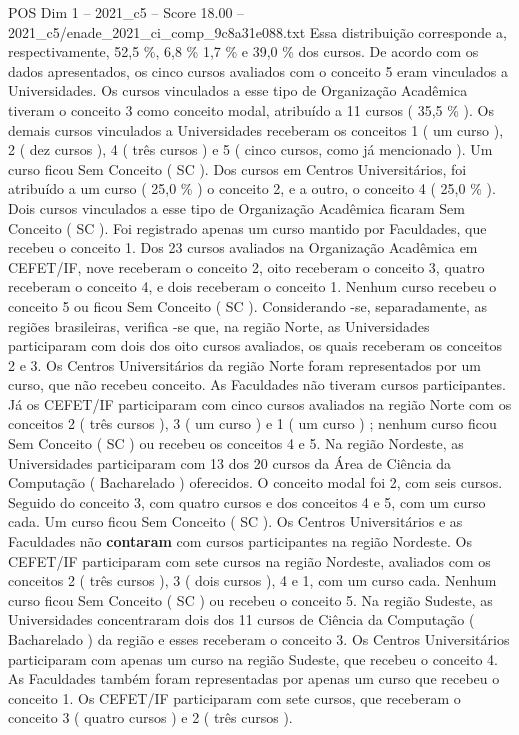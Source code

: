 \begin{textsample}{POS Dim 1 – 2021\_c5 – Score 18.00 – 2021\_c5/enade\_2021\_ci\_comp\_9c8a31e088.txt}
Essa distribuição corresponde a, respectivamente, 52,5 \%, 6,8 \% 1,7 \% e 39,0 \% dos cursos.
De acordo com os dados apresentados, os cinco cursos avaliados com o conceito 5 eram vinculados a Universidades.
Os cursos vinculados a esse tipo de Organização Acadêmica tiveram o conceito 3 como conceito modal, atribuído a 11 cursos ( 35,5 \% ).
Os demais cursos vinculados a Universidades receberam os conceitos 1 ( um curso ), 2 ( dez cursos ), 4 ( três cursos ) e 5 ( cinco cursos, como já mencionado ).
Um curso ficou Sem Conceito ( SC ).
Dos cursos em Centros Universitários, foi atribuído a um curso ( 25,0 \% ) o conceito 2, e a outro, o conceito 4 ( 25,0 \% ).
Dois cursos vinculados a esse tipo de Organização Acadêmica ficaram Sem Conceito ( SC ).
Foi registrado apenas um curso mantido por Faculdades, que recebeu o conceito 1.
Dos 23 cursos avaliados na Organização Acadêmica em CEFET/IF, nove receberam o conceito 2, oito receberam o conceito 3, quatro receberam o conceito 4, e dois receberam o conceito 1.
Nenhum curso recebeu o conceito 5 ou ficou Sem Conceito ( SC ).
Considerando -se, separadamente, as regiões brasileiras, verifica -se que, na região Norte, as Universidades participaram com dois dos oito cursos avaliados, os quais receberam os conceitos 2 e 3.
Os Centros Universitários da região Norte foram representados por um curso, que não recebeu conceito.
As Faculdades não tiveram cursos participantes.
Já os CEFET/IF participaram com cinco cursos avaliados na região Norte com os conceitos 2 ( três cursos ), 3 ( um curso ) e 1 ( um curso ) ; nenhum curso ficou Sem Conceito ( SC ) ou recebeu os conceitos 4 e 5.
Na região Nordeste, as Universidades participaram com 13 dos 20 cursos da Área de Ciência da Computação ( Bacharelado ) oferecidos.
O conceito modal foi 2, com seis cursos.
Seguido do conceito 3, com quatro cursos e dos conceitos 4 e 5, com um curso cada.
Um curso ficou Sem Conceito ( SC ).
Os Centros Universitários e as Faculdades não \textbf{contaram} com cursos participantes na região Nordeste.
Os CEFET/IF participaram com sete cursos na região Nordeste, avaliados com os conceitos 2 ( três cursos ), 3 ( dois cursos ), 4 e 1, com um curso cada.
Nenhum curso ficou Sem Conceito ( SC ) ou recebeu o conceito 5.
Na região Sudeste, as Universidades concentraram dois dos 11 cursos de Ciência da Computação ( Bacharelado ) da região e esses receberam o conceito 3.
Os Centros Universitários participaram com apenas um curso na região Sudeste, que recebeu o conceito 4.
As Faculdades também foram representadas por apenas um curso que recebeu o conceito 1.
Os CEFET/IF participaram com sete cursos, que receberam o conceito 3 ( quatro cursos ) e 2 ( três cursos ).

\end{textsample}
